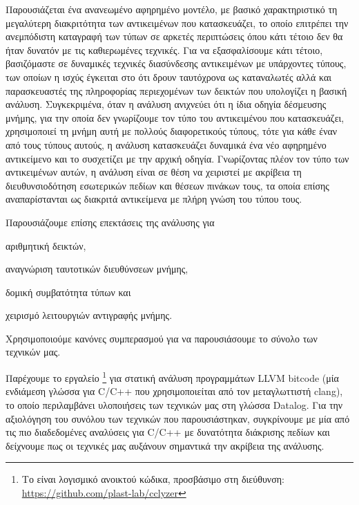 Παρουσιάζεται ένα ανανεωμένο αφηρημένο μοντέλο, με βασικό
χαρακτηριστικό τη μεγαλύτερη διακριτότητα των αντικειμένων που
κατασκευάζει, το οποίο επιτρέπει την ανεμπόδιστη καταγραφή των τύπων
σε αρκετές περιπτώσεις όπου κάτι τέτοιο δεν θα ήταν δυνατόν με τις
καθιερωμένες τεχνικές.  Για να εξασφαλίσουμε κάτι τέτοιο, βασιζόμαστε
σε δυναμικές τεχνικές διασύνδεσης αντικειμένων με υπάρχοντες τύπους,
των οποίων η ισχύς έγκειται στο ότι δρουν ταυτόχρονα ως καταναλωτές
αλλά και παρασκευαστές της πληροφορίας περιεχομένων των δεικτών που
υπολογίζει η βασική ανάλυση. Συγκεκριμένα, όταν η ανάλυση ανιχνεύει
ότι η ίδια οδηγία δέσμευσης μνήμης, για την οποία δεν γνωρίζουμε τον
τύπο του αντικειμένου που κατασκευάζει, χρησιμοποιεί τη μνήμη αυτή με
πολλούς διαφορετικούς τύπους, τότε για κάθε έναν από τους τύπους
αυτούς, η ανάλυση κατασκευάζει δυναμικά ένα νέο αφηρημένο αντικείμενο
και το συσχετίζει με την αρχική οδηγία. Γνωρίζοντας πλέον τον τύπο των
αντικειμένων αυτών, η ανάλυση είναι σε θέση να χειριστεί με ακρίβεια
τη διευθυνσιοδότηση εσωτερικών πεδίων και θέσεων πινάκων τους, τα
οποία επίσης αναπαρίστανται ως διακριτά αντικείμενα με πλήρη γνώση του
τύπου τους.

Παρουσιάζουμε επίσης επεκτάσεις της ανάλυσης για
\begin{inparaenum}[(1)]
\item αριθμητική δεικτών,
\item αναγνώριση ταυτοτικών διευθύνσεων μνήμης,
\item δομική συμβατότητα τύπων και
\item χειρισμό λειτουργιών αντιγραφής μνήμης.
\end{inparaenum}
Χρησιμοποιούμε κανόνες συμπερασμού για να παρουσιάσουμε το σύνολο των
τεχνικών μας.

Παρέχουμε το εργαλείο {\en \cclyzer{}}\footnote{Το {\en \cclyzer{}}
  είναι λογισμικό ανοικτού κώδικα, προσβάσιμο στη διεύθυνση: {\en
    \url{https://github.com/plast-lab/cclyzer}}} για στατική ανάλυση
προγραμμάτων {\en LLVM bitcode} (μία ενδιάμεση γλώσσα για {\en C/C++}
που χρησιμοποιείται από τον μεταγλωττιστή {\en clang}), το οποίο
περιλαμβάνει υλοποιήσεις των τεχνικών μας στη γλώσσα {\en Datalog}.
%
Για την αξιολόγηση του συνόλου των τεχνικών που παρουσιάστηκαν,
συγκρίνουμε με μία από τις πιο διαδεδομένες αναλύσεις για {\en C/C++}
με δυνατότητα διάκρισης πεδίων
\cite{paste/PearceKH04,toplas/PearceKH07} και δείχνουμε πως οι
τεχνικές μας αυξάνουν σημαντικά την ακρίβεια της ανάλυσης.



